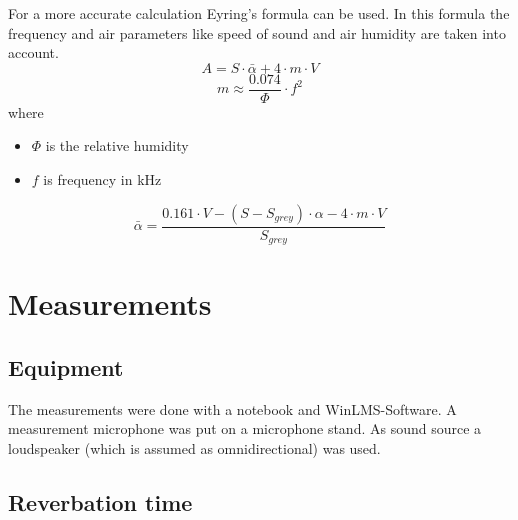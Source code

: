 \documentclass{article}
\begin{document}
For a more accurate calculation Eyring's formula can be used. In this formula the frequency and air parameters like speed of sound and air humidity are taken into account. 
\begin{equation}
A=S\cdot\bar{\alpha}+4\cdot m\cdot V
\end{equation}
\begin{equation}
m\approx\frac{0.074}{\Phi}\cdot f^2
\end{equation}
where
\begin{itemize}
\item $\Phi$ is the relative humidity
\item $f$ is frequency in kHz
\end{itemize}
\begin{equation}
\bar{\alpha}=\frac{0.161\cdot V-(S-S_{grey})\cdot\alpha-4\cdot m\cdot V}{S_{grey}}
\end{equation}


\section{Measurements}
\subsection{Equipment}
The measurements were done with a notebook and WinLMS-Software. A measurement microphone was put on a microphone stand. As sound source a loudspeaker (which is assumed as omnidirectional) was used.
\subsection{Reverbation time}
\end{document}
